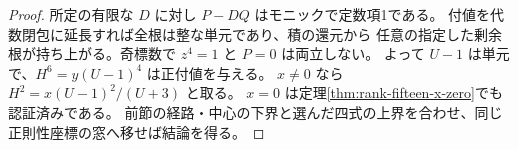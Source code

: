 \begin{proof}
所定の有限な $D$ に対し $P-DQ$ はモニックで定数項1である。
付値を代数閉包に延長すれば全根は整な単元であり、積の還元から
任意の指定した剰余根が持ち上がる。奇標数で $z^4=1$ と $P=0$ は両立しない。
よって $U-1$ は単元で、$H^6=y(U-1)^4$ は正付値を与える。
$x\ne0$ なら $H^2=x(U-1)^2/(U+3)$ と取る。
$x=0$ は定理\ref{thm:rank-fifteen-x-zero}でも認証済みである。
前節の経路・中心の下界と選んだ四式の上界を合わせ、同じ正則性座標の窓へ移せば結論を得る。
\end{proof}
